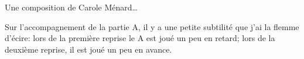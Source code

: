 Une composition de Carole Ménard\ldots

\tune

Sur l'accompagnement de la partie A, il y a une petite subtilité que j'ai la
flemme d'écire: lors de la première reprise le A est joué un peu en retard;
lors de la deuxième reprise, il est joué un peu en avance.

